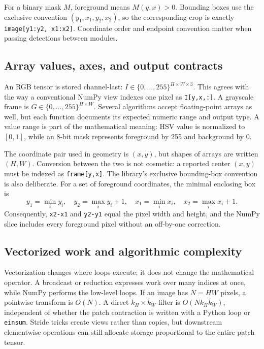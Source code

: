 \documentclass[11pt,a4paper]{article}
\newcommand{\1}{\mathbf{1}}
\begin{document}
For a binary mask $M$, foreground means $M(y,x)>0$. Bounding boxes use the
exclusive convention $(y_1,x_1,y_2,x_2)$, so the corresponding crop is exactly
\texttt{image[y1:y2, x1:x2]}. Coordinate order and endpoint convention matter when
passing detections between modules.

\subsection{Array values, axes, and output contracts}

An RGB tensor is stored channel-last: $I\in\{0,\ldots,255\}^{H\times W\times3}$.
This agrees with the way a conventional NumPy view indexes one pixel as
\texttt{I[y,x,:]}. A grayscale frame is $G\in\{0,\ldots,255\}^{H\times W}$.
Several algorithms accept floating-point arrays as well, but each function
documents its expected numeric range and output type. A value range is part of
the mathematical meaning: HSV value is normalized to $[0,1]$, while an 8-bit
mask represents foreground by 255 and background by 0.

The coordinate pair used in geometry is $(x,y)$, but shapes of arrays are
written $(H,W)$. Conversion between the two is not cosmetic: a reported center
$(x,y)$ must be indexed as \texttt{frame[y,x]}. The library's exclusive bounding-box
convention is also deliberate. For a set of foreground coordinates, the
minimal enclosing box is
\[
 y_1=\min_i y_i,\quad y_2=\max_i y_i+1,\quad
 x_1=\min_i x_i,\quad x_2=\max_i x_i+1.
\]
Consequently, \texttt{x2-x1} and \texttt{y2-y1} equal the pixel width and height, and the
NumPy slice includes every foreground pixel without an off-by-one correction.

\subsection{Vectorized work and algorithmic complexity}

Vectorization changes where loops execute; it does not change the mathematical
operator. A broadcast or reduction expresses work over many indices at once,
while NumPy performs the low-level loops. If an image has $N=HW$ pixels, a
pointwise transform is $O(N)$. A direct $k_H\times k_W$ filter is
$O(Nk_Hk_W)$, independent of whether the patch contraction is written with a
Python loop or \texttt{einsum}. Stride tricks create views rather than copies, but
downstream elementwise operations can still allocate storage proportional to
the entire patch tensor.
\end{document}
